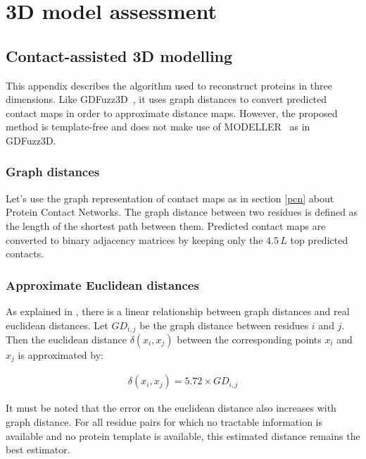 \chapter{3D model assessment}

    \section{Contact-assisted 3D modelling}

    This appendix describes the algorithm used to reconstruct
    proteins in three dimensions. Like GDFuzz3D~\cite{pietal2015gdfuzz3d},
    it uses graph distances to convert predicted contact maps
    in order to approximate distance maps. However, the proposed method is template-free
    and does not make use of MODELLER~\cite{modeller} as in GDFuzz3D.

    \subsection{Graph distances}

        Let's use the graph representation of contact maps as in section \ref{pcn}
        about Protein Contact Networks.
        The graph distance between two residues is defined as the length of
        the shortest path between them.
        Predicted contact maps are converted to binary adjacency matrices
        by keeping only the $4.5\,L$ top predicted contacts.

    \subsection{Approximate Euclidean distances}

        As explained in \cite{pietal2015gdfuzz3d}, there is a linear relationship
        between graph distances and real euclidean distances.
        Let $GD_{i,j}$ be the graph distance between residues $i$ and $j$. Then
        the euclidean distance $\delta(x_i, x_j)$ between the corresponding
        points $x_i$ and $x_j$ is approximated by:  %

        \begin{align}
            \delta(x_i, x_j) = 5.72 \times GD_{i,j}
        \end{align}

        It must be noted that the error on the euclidean distance also increases
        with graph distance. For all residue pairs for which no tractable information
        is available and no protein template is available,
        this estimated distance remains the best estimator.

